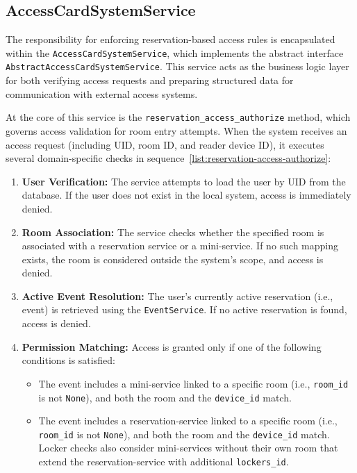 \subsection{AccessCardSystemService}

The responsibility for enforcing reservation-based access rules is encapsulated within the \texttt{AccessCardSystemService}, which implements the abstract interface \texttt{AbstractAccessCardSystemService}. This service acts as the business logic layer for both verifying access requests and preparing structured data for communication with external access systems.

At the core of this service is the \texttt{reservation\_access\_authorize} method, which governs access validation for room entry attempts. When the system receives an access request (including UID, room ID, and reader device ID), it executes several domain-specific checks in sequence~\ref{list:reservation-access-authorize}:

\begin{enumerate}
  \item \textbf{User Verification:} The service attempts to load the user by UID from the database. If the user does not exist in the local system, access is immediately denied.
  \item \textbf{Room Association:} The service checks whether the specified room is associated with a reservation service or a mini-service. If no such mapping exists, the room is considered outside the system's scope, and access is denied.
  \item \textbf{Active Event Resolution:} The user's currently active reservation (i.e., event) is retrieved using the \texttt{EventService}. If no active reservation is found, access is denied.
  \item \textbf{Permission Matching:} Access is granted only if one of the following conditions is satisfied:
  \begin{itemize}
    \item The event includes a mini-service linked to a specific room (i.e., \texttt{room\_id} is not \texttt{None}), and both the room and the \texttt{device\_id} match.
    \item The event includes a reservation-service linked to a specific room (i.e., \texttt{room\_id} is not \texttt{None}), and both the room and the \texttt{device\_id} match. Locker checks also consider mini-services without their own room that extend the reservation-service with additional \texttt{lockers\_id}.
  \end{itemize}
\end{enumerate}

